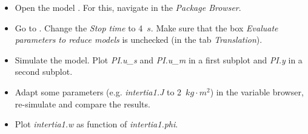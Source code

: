 \documentclass[10pt,a4paper]{article}
\begin{document}
\begin{itemize}
	\item Open the model . For this, navigate in the \textit{Package Browser}.
	\item Go to . Change the \textit{Stop time} to 4~$s$. Make sure that the box \textit{Evaluate parameters to reduce models} is unchecked (in the tab \textit{Translation}).
	\item Simulate the model. Plot \textit{PI.u\_s} and \textit{PI.u\_m} in a first subplot and \textit{PI.y} in a second subplot.
	\item Adapt some parameters (e.g. \textit{intertia1.J} to 2~$kg \cdot m^2$) in the variable browser, re-simulate and compare the results.
	\item Plot \textit{intertia1.w} as function of \textit{intertia1.phi}.
\end{itemize}
\end{document}
